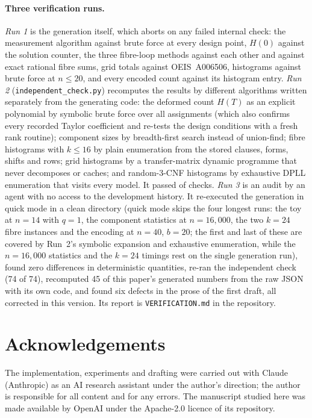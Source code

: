 \documentclass[11pt]{article}
\theoremstyle{definition}
\theoremstyle{remark}
\begin{document}
\paragraph{Three verification runs.} \emph{Run 1} is the generation itself, which aborts on any failed internal check: the measurement algorithm against brute force at every design point, $H(0)$ against the solution counter, the three fibre-loop methods against each other and against exact rational fibre sums, grid totals against OEIS~A006506, histograms against brute force at $n \le 20$, and every encoded count against its histogram entry. \emph{Run 2} (\texttt{independent\_check.py}) recomputes the results by different algorithms written separately from the generating code: the deformed count $H(T)$ as an explicit polynomial by symbolic brute force over all assignments (which also confirms every recorded Taylor coefficient and re-tests the design conditions with a fresh rank routine); component sizes by breadth-first search instead of union-find; fibre histograms with $k \le 16$ by plain enumeration from the stored clauses, forms, shifts and rows; grid histograms by a transfer-matrix dynamic programme that never decomposes or caches; and random-3-CNF histograms by exhaustive DPLL enumeration that visits every model. It passed \indepPassed{} of \indepChecks{} checks. \emph{Run 3} is an audit by an agent with no access to the development history. It re-executed the generation in quick mode in a clean directory (quick mode skips the four longest runs: the toy at $n = 14$ with $q = 1$, the component statistics at $n = 16{,}000$, the two $k = 24$ fibre instances and the encoding at $n = 40$, $b = 20$; the first and last of these are covered by Run~2's symbolic expansion and exhaustive enumeration, while the $n = 16{,}000$ statistics and the $k = 24$ timings rest on the single generation run), found zero differences in deterministic quantities, re-ran the independent check (74 of 74), recomputed 45 of this paper's generated numbers from the raw JSON with its own code, and found six defects in the prose of the first draft, all corrected in this version. Its report is \texttt{VERIFICATION.md} in the repository.

\section*{Acknowledgements}
The implementation, experiments and drafting were carried out with Claude (Anthropic) as an AI research assistant under the author's direction; the author is responsible for all content and for any errors. The manuscript studied here was made available by OpenAI under the Apache-2.0 licence of its repository.
\end{document}
